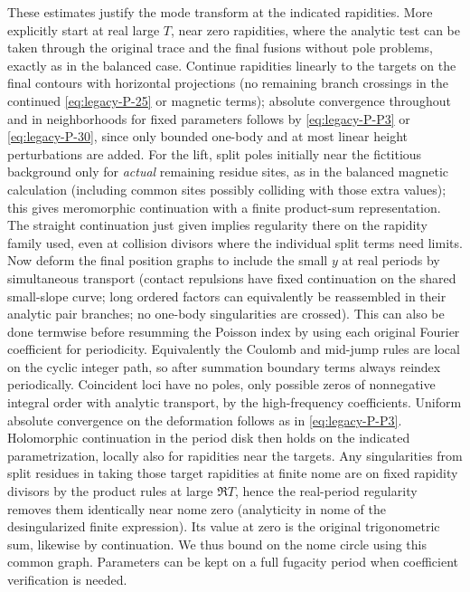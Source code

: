 These estimates justify the mode transform at the indicated rapidities. More explicitly start at real large \(T\), near zero rapidities, where the analytic test can be taken through the original trace and the final fusions without pole problems, exactly as in the balanced case. Continue rapidities linearly to the targets on the final contours with horizontal projections (no remaining branch crossings in the continued \eqref{eq:legacy-P-25} or magnetic terms); absolute convergence throughout and in neighborhoods for fixed parameters follows by \eqref{eq:legacy-P-P3} or \eqref{eq:legacy-P-30}, since only bounded one-body and at most linear height perturbations are added. For the lift, split poles initially near the fictitious background only for \emph{actual} remaining residue sites, as in the balanced magnetic calculation (including common sites possibly colliding with those extra values); this gives meromorphic continuation with a finite product-sum representation. The straight continuation just given implies regularity there on the rapidity family used, even at collision divisors where the individual split terms need limits. Now deform the final position graphs to include the small \(y\) at real periods by simultaneous transport (contact repulsions have fixed continuation on the shared small-slope curve; long ordered factors can equivalently be reassembled in their analytic pair branches; no one-body singularities are crossed). This can also be done termwise before resumming the Poisson index by using each original Fourier coefficient for periodicity. Equivalently the Coulomb and mid-jump rules are local on the cyclic integer path, so after summation boundary terms always reindex periodically. Coincident loci have no poles, only possible zeros of nonnegative integral order with analytic transport, by the high-frequency coefficients. Uniform absolute convergence on the deformation follows as in \eqref{eq:legacy-P-P3}. Holomorphic continuation in the period disk then holds on the indicated parametrization, locally also for rapidities near the targets. Any singularities from split residues in taking those target rapidities at finite nome are on fixed rapidity divisors by the product rules at large \(\Re T\), hence the real-period regularity removes them identically near nome zero (analyticity in nome of the desingularized finite expression). Its value at zero is the original trigonometric sum, likewise by continuation. We thus bound on the nome circle using this common graph. Parameters can be kept on a full fugacity period when coefficient verification is needed.



